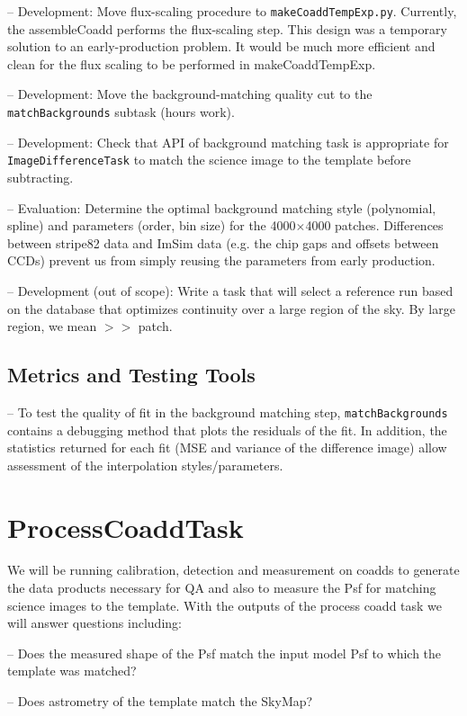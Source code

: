 \documentclass[12pt]{article}
\begin{document}
-- Development: Move flux-scaling procedure to {\tt makeCoaddTempExp.py}.  Currently, the assembleCoadd performs the flux-scaling step. This design was a temporary solution to an early-production problem.  It would be much more efficient and clean for the flux scaling to be performed in makeCoaddTempExp.

-- Development:  Move the background-matching quality cut to the {\tt matchBackgrounds} subtask (hours work).

-- Development:  Check that API of background matching task is appropriate for {\tt ImageDifferenceTask} to match the science image to the template before subtracting. 

-- Evaluation: Determine the optimal background matching style (polynomial, spline) and parameters (order, bin size) for the 4000$\times$4000 patches. Differences between stripe82 data and ImSim data (e.g. the chip gaps and offsets between CCDs) prevent us from simply reusing the parameters from early production.

-- Development (out of scope): Write a task that will select a reference run based on the database that optimizes continuity over a large region of the sky. By large region, we mean $>>$ patch. 

\subsection{Metrics and Testing Tools}

-- To test the quality of fit in the background matching step, {\tt matchBackgrounds} contains a debugging method that plots the residuals of the fit.  In addition, the statistics returned for each fit (MSE and variance of the difference image) allow assessment of the interpolation styles/parameters.


\clearpage 
\section{ProcessCoaddTask} 
We will be running calibration, detection and measurement on coadds to 
generate the data products necessary for QA and also to measure the Psf
for matching science images to the template.  With the outputs of the process coadd task we will answer questions including:

-- Does the measured shape of the Psf match the input model Psf to which the template was matched?

-- Does astrometry of the template match the SkyMap?
\end{document}

